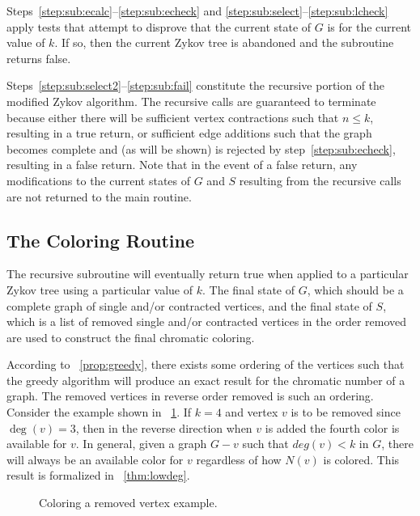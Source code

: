Steps~\ref{step:sub:ecalc}--\ref{step:sub:echeck} and \ref{step:sub:select}--\ref{step:sub:lcheck} apply tests
that attempt to disprove that the current state of \(G\) is  for the current value of \(k\).  If so,
then the current Zykov tree is abandoned and the subroutine returns false.

Steps~\ref{step:sub:select2}--\ref{step:sub:fail} constitute the recursive portion of the modified Zykov algorithm.
The recursive calls are guaranteed to terminate because either there will be sufficient vertex contractions such
that \(n\le k\), resulting in a true return, or sufficient edge additions such that the graph becomes complete and
(as will be shown) is rejected by step~\ref{step:sub:echeck}, resulting in a false return.  Note that in the event
of a false return, any modifications to the current states of \(G\) and \(S\) resulting from the recursive calls
are not returned to the main routine.

\subsection{The Coloring Routine}\label{sec:sub:coloring}

The recursive subroutine will eventually return true when applied to a particular Zykov tree using a particular
value of \(k\).  The final state of \(G\), which should be a complete graph of single and/or contracted vertices,
and the final state of \(S\), which is a list of removed single and/or contracted vertices in the order removed are
used to construct the final chromatic coloring.

According to \propname~\ref{prop:greedy}, there exists some ordering of the vertices such that the greedy algorithm
will produce an exact result for the chromatic number of a graph.  The removed vertices in reverse order removed is
such an ordering.  Consider the example shown in \figurename~\ref{fig:reverse}.  If \(k=4\) and vertex \(v\) is to
be removed since \(\deg(v)=3\), then in the reverse direction when \(v\) is added the fourth color is available for
\(v\).  In general, given a graph \(G-v\) such that \(deg(v)<k\) in \(G\), there will always be an available color
for \(v\) regardless of how \(N(v)\) is colored.  This result is formalized in \theoremname~\ref{thm:lowdeg}.

\begin{figure}[H]
  \centering
  \caption{Coloring a removed vertex example.}
  \label{fig:reverse}
\end{figure}


